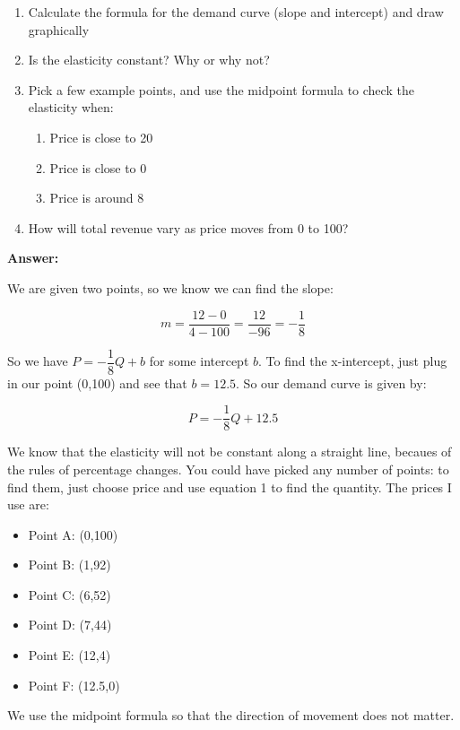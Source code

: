 \documentclass[12pt]{article}
\begin{document}
\begin{enumerate}
    \item Calculate the formula for the demand curve (slope and intercept) and draw graphically
    \item Is the elasticity constant? Why or why not?
    \item Pick a few example points, and use the midpoint formula to check the elasticity when:
        \begin{enumerate}
            \item Price is close to 20
            \item Price is close to 0
            \item Price is around 8
        \end{enumerate}
    \item How will total revenue vary as price moves from 0 to 100?
\end{enumerate}

\textbf{Answer:}

We are given two points, so we know we can find the slope:

$$ m = \dfrac{12-0}{4-100} = \dfrac{12}{-96} = -\dfrac{1}{8} $$

So we have $P = -\dfrac{1}{8}Q + b$ for some intercept $b$. To find the x-intercept, just plug in our point (0,100) and see that $b = 12.5$. So our demand curve is given by:

\begin{equation}
    \label{eq:demand}
    P = -\dfrac{1}{8} Q + 12.5
\end{equation}

We know that the elasticity will not be constant along a straight line, becaues of the rules of percentage changes. You could have picked any number of points: to find them, just choose price and use equation 1 to find the quantity. The prices I use are:
\begin{itemize}
    \item Point A: (0,100)
    \item Point B: (1,92)
    \item Point C: (6,52)
    \item Point D: (7,44)
    \item Point E: (12,4)
    \item Point F: (12.5,0)
\end{itemize}

We use the midpoint formula so that the direction of movement does not matter. 
\end{document}
